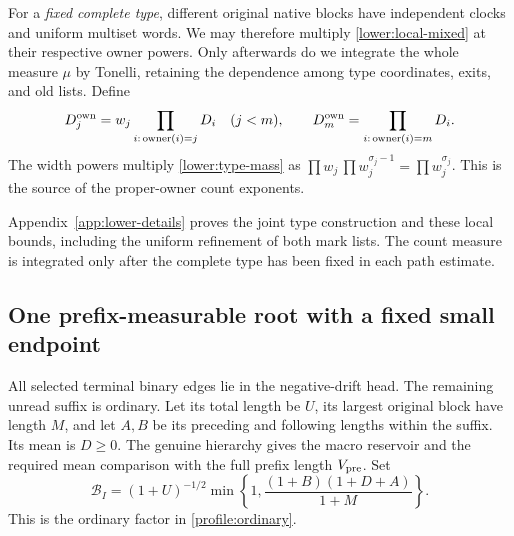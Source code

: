For a \emph{fixed complete type}, different original native blocks
have independent clocks and uniform multiset words.  We may therefore
multiply \eqref{lower:local-mixed} at their respective owner powers.
Only afterwards do we integrate the whole measure $\mu$ by Tonelli,
retaining the dependence among type coordinates, exits, and old lists.
Define
\begin{equation}
 D_j^{\rm own}=w_j\prod_{i:\,\operatorname{owner}(i)=j}D_i
 \quad(j<m),\qquad
 D_m^{\rm own}=\prod_{i:\,\operatorname{owner}(i)=m}D_i.
 \label{lower:owner-cost}
\end{equation}
The width powers multiply \eqref{lower:type-mass} as
$\prod w_j\,\prod w_j^{\sigma_j-1}=\prod w_j^{\sigma_j}$.
This is the source of the proper-owner count exponents.

Appendix~\ref{app:lower-details} proves the joint type construction and
these local bounds, including the uniform refinement of both mark lists.
The count measure is integrated only after the complete type has been
fixed in each path estimate.

\subsection{One prefix-measurable root with a fixed small endpoint}
\label{lower:root}
All selected terminal binary edges lie in the negative-drift head.
The remaining unread suffix is ordinary.  Let its total length be
$U$, its largest original block have length $M$, and let $A,B$ be
its preceding and following lengths within the suffix.  Its mean is
$D\geq0$.  The genuine hierarchy gives the macro reservoir and the
required mean comparison with the full prefix length $V_{\rm pre}$.
Set
\begin{equation}
 \mathcal B_I=(1+U)^{-1/2}
       \min\left\{1,\frac{(1+B)(1+D+A)}{1+M}\right\}.
 \label{lower:ordinary-factor}
\end{equation}
This is the ordinary factor in \eqref{profile:ordinary}.

